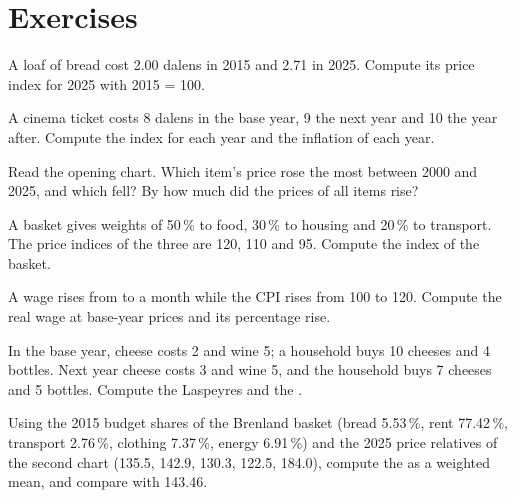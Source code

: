 \section{Exercises}

\begin{exercise}[$\star$]\label{exo:g10:price-indices:1}
A loaf of bread cost 2.00 dalens in 2015 and 2.71 in 2025. Compute its price index for 2025 with 2015 = 100.
\end{exercise}

\begin{exercise}[$\star$]\label{exo:g10:price-indices:2}
A cinema ticket costs 8 dalens in the base year, 9 the next year and 10 the year after. Compute the index for each year and the inflation of each year.
\end{exercise}

\begin{exercise}[$\star$]\label{exo:g10:price-indices:3}
Read the opening chart. Which item's price rose the most between 2000 and 2025, and which fell? By how much did the prices of all items rise?
\end{exercise}

\begin{exercise}[$\star$]\label{exo:g10:price-indices:4}
A basket gives weights of 50\,\% to food, 30\,\% to housing and 20\,\% to transport. The price indices of the three are 120, 110 and 95. Compute the index of the
basket.
\end{exercise}

\begin{exercise}[$\star$]\label{exo:g10:price-indices:5}
A wage rises from  to  a month while the CPI rises from 100 to 120. Compute the real wage at base-year prices and its percentage rise.
\end{exercise}

\begin{exercise}[$\star\star$]\label{exo:g10:price-indices:6}
In the base year, cheese costs 2 and wine 5; a household buys 10 cheeses and 4 bottles. Next year cheese costs 3 and wine 5, and the household buys 7 cheeses and 5
bottles. Compute the Laspeyres and the .
\end{exercise}

\begin{exercise}[$\star\star$]\label{exo:g10:price-indices:7}
Using the 2015 budget shares of the Brenland basket (bread 5.53\,\%, rent 77.42\,\%, transport 2.76\,\%, clothing 7.37\,\%, energy 6.91\,\%) and the 2025 price relatives
of the second chart (135.5, 142.9, 130.3, 122.5, 184.0), compute the  as a weighted mean, and compare with 143.46.
\end{exercise}

